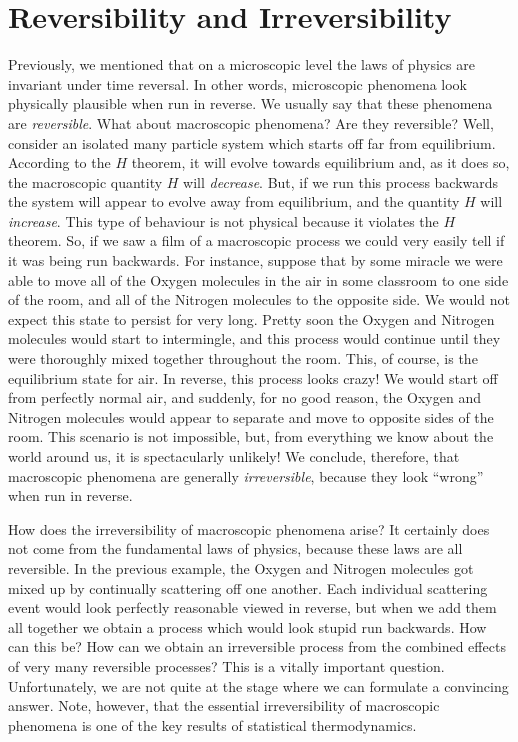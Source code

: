 \section{Reversibility and Irreversibility}\label{s3.11}
Previously, we mentioned  that on a microscopic level the laws of physics are
invariant under time reversal. In other words, microscopic phenomena look
physically plausible when run in reverse. We usually say that these phenomena are
{\em reversible}. What about macroscopic phenomena? Are they reversible?
Well, consider an isolated 
 many particle system which starts off far from equilibrium.
According to the $H$ theorem,  it will evolve towards 
equilibrium and, as it does so, the macroscopic
quantity $H$  will {\em decrease}.
But, if we run this process backwards the system will
appear to evolve away from equilibrium, 
and the quantity $H$ will  {\em increase}.
This type of behaviour is not physical because it
violates the $H$ theorem. So, if we saw a film of
a macroscopic process 
we could very easily tell if it was being run backwards. 
For instance, suppose that by some miracle we were able to move all of the
Oxygen molecules in the air in some classroom to  one side of the room, and
all of the Nitrogen molecules to the opposite side. We would not expect this
state to persist for very long. Pretty soon the Oxygen and Nitrogen molecules
would start to intermingle, and this process would
continue until they were thoroughly mixed together throughout the room.
This, of course,  is the equilibrium state for air. In reverse, this process
looks crazy! We would start off from perfectly normal air, and
suddenly, for no good reason, the Oxygen and Nitrogen molecules would
appear to separate and move to opposite sides of the room. This scenario
is not impossible, but, from everything we know about the world around us,
it is spectacularly unlikely!
We conclude, therefore, that 
macroscopic phenomena are generally {\em irreversible}, because they look ``wrong''
when run in reverse.

How does the irreversibility of macroscopic phenomena arise? It certainly
does not come from the fundamental laws of physics, because these laws 
are all reversible.
In the previous example, the Oxygen and Nitrogen molecules got mixed up
by continually scattering off one another. Each individual scattering event
would look perfectly reasonable viewed in reverse, but when we add them all together
we obtain a process which would look stupid run backwards. How can this be?
How can we obtain an irreversible process from  the combined effects of
very many  reversible
processes? This is a vitally important question. Unfortunately, we are not
quite at the stage where we can formulate a convincing answer. Note, however, that the essential irreversibility of macroscopic phenomena is one of the
key results of statistical thermodynamics. 

